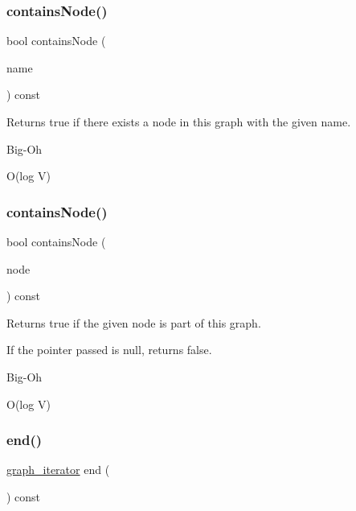 \subsubsection{\texorpdfstring{contains\+Node()}{containsNode()}\hspace{0.1cm}{\footnotesize\ttfamily [1/2]}}
{\footnotesize\ttfamily bool contains\+Node (\begin{DoxyParamCaption}\item[{const std\+::string \&}]{name }\end{DoxyParamCaption}) const}



Returns true if there exists a node in this graph with the given name. 

\begin{DoxyRefDesc}{Big-\/\+Oh}
\item[\mbox{\hyperlink{BigOh__BigOh000056}{Big-\/\+Oh}}]O(log V) \end{DoxyRefDesc}
\mbox{\label{classGraph_a4f540ebc07c4e46a0bb7fee76a93386c}} 
\subsubsection{\texorpdfstring{contains\+Node()}{containsNode()}\hspace{0.1cm}{\footnotesize\ttfamily [2/2]}}
{\footnotesize\ttfamily bool contains\+Node (\begin{DoxyParamCaption}\item[{Node\+Type $\ast$}]{node }\end{DoxyParamCaption}) const}



Returns true if the given node is part of this graph. 

If the pointer passed is null, returns false. \begin{DoxyRefDesc}{Big-\/\+Oh}
\item[\mbox{\hyperlink{BigOh__BigOh000057}{Big-\/\+Oh}}]O(log V) \end{DoxyRefDesc}
\mbox{\label{classGraph_afcdf62cae5d7e50644957d66f886742d}} 
\subsubsection{\texorpdfstring{end()}{end()}}
{\footnotesize\ttfamily \mbox{\hyperlink{classGraph_a695969c31e87f9e8319d74e5ca39024b}{graph\+\_\+iterator}} end (\begin{DoxyParamCaption}{ }\end{DoxyParamCaption}) const\hspace{0.3cm}{\ttfamily [inline]}}



